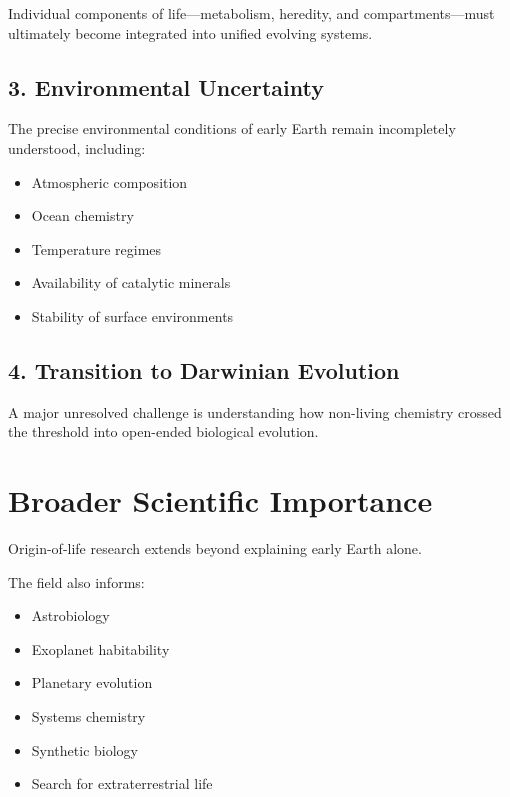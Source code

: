 \documentclass[
  oneside]{book}
\providecommand{\tightlist}{%
  \setlength{\itemsep}{0pt}\setlength{\parskip}{0pt}}
\begin{document}
Individual components of life---metabolism, heredity, and compartments---must ultimately become integrated into unified evolving systems.

\subsection{3. Environmental Uncertainty}\label{environmental-uncertainty}

The precise environmental conditions of early Earth remain incompletely understood, including:

\begin{itemize}
\tightlist
\item
  Atmospheric composition
\item
  Ocean chemistry
\item
  Temperature regimes
\item
  Availability of catalytic minerals
\item
  Stability of surface environments
\end{itemize}

\subsection{4. Transition to Darwinian Evolution}\label{transition-to-darwinian-evolution}

A major unresolved challenge is understanding how non-living chemistry crossed the threshold into open-ended biological evolution.

\section{Broader Scientific Importance}\label{broader-scientific-importance}

Origin-of-life research extends beyond explaining early Earth alone.

The field also informs:

\begin{itemize}
\tightlist
\item
  Astrobiology
\item
  Exoplanet habitability
\item
  Planetary evolution
\item
  Systems chemistry
\item
  Synthetic biology
\item
  Search for extraterrestrial life
\end{itemize}
\end{document}

